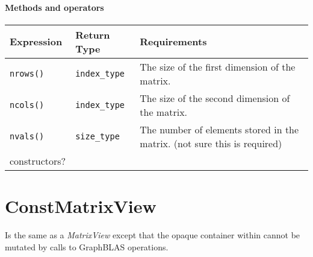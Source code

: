 \paragraph{Methods and operators}

\begin{tabularx}{\textwidth}{l l X}
\textbf{Expression} & \textbf{Return Type} & \textbf{Requirements}\\
\hline
\texttt{nrows()} & \texttt{index\_type} & The size of the first dimension of the matrix.\\ \hline
\texttt{ncols()} & \texttt{index\_type} & The size of the second dimension of the matrix.\\ \hline
\texttt{nvals()} & \texttt{size\_type}  & The number of elements stored in the matrix. (not sure this is required)\\ \hline
constructors? & & \\
\end{tabularx}

\section{ConstMatrixView}

Is the same as a \textit{MatrixView} except that the opaque container within cannot be
mutated by calls to GraphBLAS operations.
